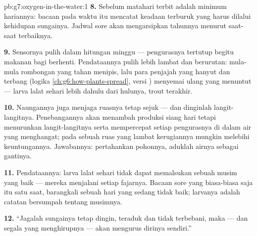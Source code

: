 \begin{solution}{pb:g7:oxygen-in-the-water:1}
\textbf{8.} Sebelum matahari terbit adalah minimum hariannya: bacaan
pada waktu itu mencatat keadaan terburuk yang harus dilalui kehidupan
sungainya. Jadwal sore akan mengarsipkan tahunnya menurut saat-saat
terbaiknya.

\textbf{9.} Sensornya pulih dalam hitungan minggu --- pengurasnya
tertutup begitu makanan bagi  berhenti. Pendataannya pulih
lebih lambat dan berurutan: mula-mula rombongan yang tahan menipis,
lalu para penjajah yang hanyut dan terbang
(logika \cref{ch:g6:how-plants-spread}, versi ) menyemai ulang
 yang menuntut --- larva lalat sehari lebih dahulu dari
hulunya,  trout terakhir.

\textbf{10.} Naungannya juga menjaga ruasnya tetap sejuk --- dan
dinginlah langit-langitnya. Penebangannya akan menambah produksi siang
hari tetapi menurunkan langit-langitnya serta mempercepat setiap
pengurasnya di dalam air yang menghangat; pada sebuah ruas yang lambat
kerugiannya mungkin melebihi keuntungannya. Jawabannya: pertahankan
pohonnya, aduklah airnya sebagai gantinya.

\textbf{11.} Pendataannya: larva lalat sehari tidak dapat memalsukan
sebuah musim yang baik --- mereka menjalani setiap fajarnya. Bacaan
sore yang biasa-biasa saja itu satu saat, barangkali sebuah hari yang
sedang tidak baik; larvanya adalah catatan bersumpah tentang musimnya.

\textbf{12.} ``Jagalah sungainya tetap dingin, teraduk dan tidak
terbebani, maka  --- dan segala yang menghirupnya --- akan
mengurus dirinya sendiri.''
\end{solution}
